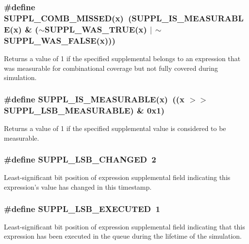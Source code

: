 \subsubsection{\setlength{\rightskip}{0pt plus 5cm}\#define SUPPL\_\-COMB\_\-MISSED(x)\ (SUPPL\_\-IS\_\-MEASURABLE(x) \& ($\sim$SUPPL\_\-WAS\_\-TRUE(x) $|$ $\sim$SUPPL\_\-WAS\_\-FALSE(x)))}\label{group__expr__suppl_a13}


Returns a value of 1 if the specified supplemental belongs to an expression that was measurable for combinational coverage but not fully covered during simulation. 
\subsubsection{\setlength{\rightskip}{0pt plus 5cm}\#define SUPPL\_\-IS\_\-MEASURABLE(x)\ ((x $>$$>$ SUPPL\_\-LSB\_\-MEASURABLE) \& 0x1)}\label{group__expr__suppl_a10}


Returns a value of 1 if the specified supplemental value is considered to be measurable. 
\subsubsection{\setlength{\rightskip}{0pt plus 5cm}\#define SUPPL\_\-LSB\_\-CHANGED\ 2}\label{group__expr__suppl_a2}


Least-significant bit position of expression supplemental field indicating this expression's value has changed in this timestamp. 
\subsubsection{\setlength{\rightskip}{0pt plus 5cm}\#define SUPPL\_\-LSB\_\-EXECUTED\ 1}\label{group__expr__suppl_a1}


Least-significant bit position of expression supplemental field indicating that this expression has been executed in the queue during the lifetime of the simulation. 
